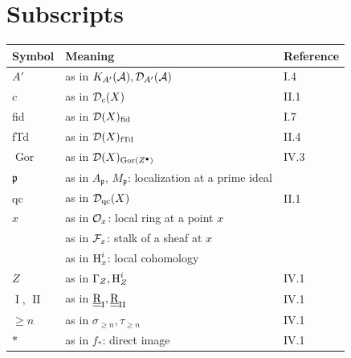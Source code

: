 \section*{Subscripts}
\begin{longtable}{@{}l p{8cm} l@{}}
	\toprule
	Symbol & Meaning & Reference \\
	\midrule
	$A'$ & as in $K_{A'}(\mathcal{A}), \mathcal{D}_{A'}(\mathcal{A})$ & I.4 \\
	$c$ & as in $\mathcal{D}_c(X)$ & II.1 \\
	fid & as in $\mathcal{D}(X)_{\text{fid}}$ & I.7 \\
	fTd & as in $\mathcal{D}(X)_{\text{fTd}}$ & II.4 \\
	$\operatorname{Gor}$ & as in $\mathcal{D}(X)_{\operatorname{Gor}(Z^\bullet)}$ & IV.3 \\
	$\mathfrak{p}$ & as in $A_\mathfrak{p},\,M_\mathfrak{p}$: localization at a prime ideal & \\
	qc & as in $\mathcal{D}_{\text{qc}}(X)$ & II.1 \\
	$x$ & as in $\mathcal{O}_x$: local ring at a point  $x$ & \\
	 & as in $\mathcal{F}_x$: stalk of a sheaf at  $x$ & \\
	 & as in $\operatorname{H}^i_x$: local cohomology & \\
	$Z$ & as in $\Gamma_Z,\operatorname{H}^i_Z$ & IV.1 \\
	$\operatorname{I},\,\operatorname{II}$ & as in $\underline{\underline{\operatorname{R}}}_{\operatorname{I}},\underline{\underline{\operatorname{R}}}_{\operatorname{II}}$ & IV.1 \\
	$\geq n$ & as in $\sigma_{\ge n},\tau_{\ge n}$ & IV.1 \\
	$*$ & as in $f_*$: direct image & IV.1 \\
\end{longtable}

